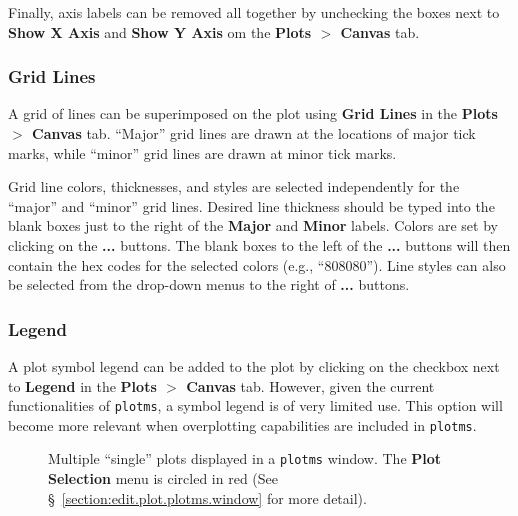 Finally, axis labels can be removed all together by unchecking the boxes next to {\bf Show X Axis} and {\bf Show Y Axis} om the {\bf Plots $>$ Canvas} tab.


\subsubsection{Grid Lines}
\label{section:edit.plot.plotms.grid}

A grid of lines can be superimposed on the plot using {\bf Grid Lines} in the {\bf Plots $>$ Canvas} tab. ``Major'' grid lines are drawn at the locations of major tick marks, while ``minor'' grid lines are drawn at minor tick marks.

Grid line colors, thicknesses, and styles are selected independently for the ``major'' and ``minor'' grid lines. Desired line thickness should be typed into the blank boxes just to the right of the {\bf Major} and {\bf Minor} labels. Colors are set  by clicking on the {\bf ...} buttons. The blank boxes to the left of the {\bf ...} buttons will then contain the hex codes for the selected colors (e.g., ``808080''). Line styles can also be selected from the drop-down menus to the right of {\bf ...} buttons.  


\subsubsection{Legend}
\label{section:edit.plot.plotms.legend}

A plot symbol legend can be added to the plot by clicking on the checkbox next to {\bf Legend} in the {\bf Plots $>$ Canvas} tab. However, given the current functionalities of {\tt plotms}, a symbol legend is of very limited use. This option will become more relevant when overplotting capabilities are included in {\tt plotms}.


\begin{figure}[h!]
\begin{center}
\caption{\label{fig:plotms_select} Multiple ``single'' plots displayed in a {\tt plotms} window. The {\bf Plot Selection} menu is circled in red (See \S~\ref{section:edit.plot.plotms.window} for more detail). } 
\hrulefill
\end{center}
\end{figure}

